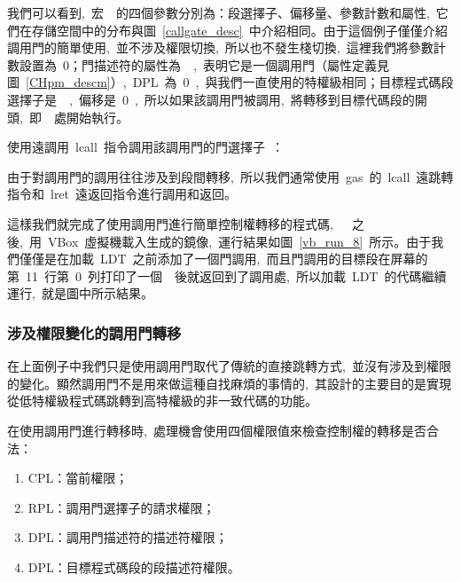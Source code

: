我們可以看到,~宏~~的四個參數分別為：段選擇子、偏移量、參數計數和屬性,~它們在存儲空間中的分布與圖~\ref{callgate_desc}~中介紹相同。由于這個例子僅僅介紹調用門的簡單使用,~並不涉及權限切換,~所以也不發生棧切換,~這裡我們將參數計數設置為~0；門描述符的屬性為~~,~表明它是一個調用門（屬性定義見圖~\ref{CHpm_descm}）,~DPL~為~0~,~與我們一直使用的特權級相同；目標程式碼段選擇子是~~,~偏移是~0~,~所以如果該調用門被調用,~將轉移到目標代碼段的開頭,~即~~處開始執行。

使用遠調用~lcall~指令調用該調用門的門選擇子~：

\label{CHpm_cg_call1}

由于對調用門的調用往往涉及到段間轉移,~所以我們通常使用~gas~的~lcall~遠跳轉指令和~lret~遠返回指令進行調用和返回。

這樣我們就完成了使用調用門進行簡單控制權轉移的程式碼,~~~之後,~用~VBox~虛擬機載入生成的鏡像,~運行結果如圖~\ref{vb_run_8}~所示。由于我們僅僅是在加載~LDT~之前添加了一個門調用,~而且門調用的目標段在屏幕的第~11~行第~0~列打印了一個~~後就返回到了調用處,~所以加載~LDT~的代碼繼續運行,~就是圖中所示結果。


\subsubsection{涉及權限變化的調用門轉移}

在上面例子中我們只是使用調用門取代了傳統的直接跳轉方式,~並沒有涉及到權限的變化。顯然調用門不是用來做這種自找麻煩的事情的,~其設計的主要目的是實現從低特權級程式碼跳轉到高特權級的非一致代碼的功能。

在使用調用門進行轉移時,~處理機會使用四個權限值來檢查控制權的轉移是否合法：

\begin{enumerate}
\item CPL：當前權限；
\item RPL：調用門選擇子的請求權限；
\item DPL：調用門描述符的描述符權限；
\item DPL：目標程式碼段的段描述符權限。
\end{enumerate}

